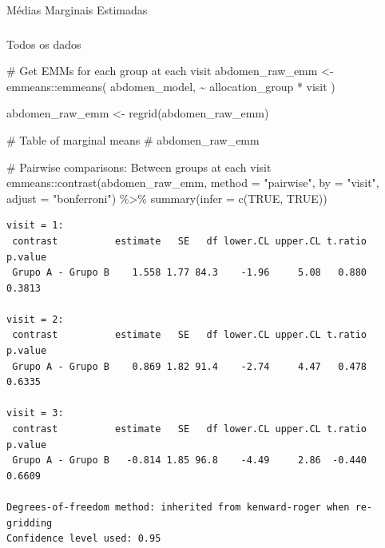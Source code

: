 \documentclass[
  12pt,
]{article}
\makeatletter
\let\oldparagraph\paragraph
\renewcommand{\paragraph}{
    \@ifstar
      \xxxParagraphStar
      \xxxParagraphNoStar
  }
\newcommand{\xxxParagraphStar}[1]{\oldparagraph*{#1}\mbox{}}
\newcommand{\xxxParagraphNoStar}[1]{\oldparagraph{#1}\mbox{}}
\let\oldsubparagraph\subparagraph
\renewcommand{\subparagraph}{
    \@ifstar
      \xxxSubParagraphStar
      \xxxSubParagraphNoStar
  }
\newcommand{\xxxSubParagraphStar}[1]{\oldsubparagraph*{#1}\mbox{}}
\newcommand{\xxxSubParagraphNoStar}[1]{\oldsubparagraph{#1}\mbox{}}
\newenvironment{Shaded}{\begin{snugshade}}{\end{snugshade}}
\newcommand{\AttributeTok}[1]{\textcolor[rgb]{0.40,0.45,0.13}{#1}}
\newcommand{\CommentTok}[1]{\textcolor[rgb]{0.37,0.37,0.37}{#1}}
\newcommand{\ConstantTok}[1]{\textcolor[rgb]{0.56,0.35,0.01}{#1}}
\newcommand{\FunctionTok}[1]{\textcolor[rgb]{0.28,0.35,0.67}{#1}}
\newcommand{\NormalTok}[1]{\textcolor[rgb]{0.00,0.23,0.31}{#1}}
\newcommand{\OtherTok}[1]{\textcolor[rgb]{0.00,0.23,0.31}{#1}}
\newcommand{\SpecialCharTok}[1]{\textcolor[rgb]{0.37,0.37,0.37}{#1}}
\newcommand{\StringTok}[1]{\textcolor[rgb]{0.13,0.47,0.30}{#1}}
\makeatother
\begin{document}
\paragraph{Médias Marginais
Estimadas}\label{muxe9dias-marginais-estimadas-13}

\subparagraph{Todos os dados}\label{todos-os-dados-13}

\begin{Shaded}
\begin{Highlighting}[]
\CommentTok{\# Get EMMs for each group at each visit}
\NormalTok{abdomen\_raw\_emm }\OtherTok{\textless{}{-}}\NormalTok{ emmeans}\SpecialCharTok{::}\FunctionTok{emmeans}\NormalTok{(}
\NormalTok{    abdomen\_model, }
    \SpecialCharTok{\textasciitilde{}}\NormalTok{ allocation\_group }\SpecialCharTok{*}\NormalTok{ visit}
\NormalTok{)}

\NormalTok{abdomen\_raw\_emm }\OtherTok{\textless{}{-}} \FunctionTok{regrid}\NormalTok{(abdomen\_raw\_emm)}

\CommentTok{\# Table of marginal means}
\CommentTok{\# abdomen\_raw\_emm}

\CommentTok{\# Pairwise comparisons: Between groups at each visit}
\NormalTok{emmeans}\SpecialCharTok{::}\FunctionTok{contrast}\NormalTok{(abdomen\_raw\_emm,}
\AttributeTok{method =} \StringTok{"pairwise"}\NormalTok{, }\AttributeTok{by =} \StringTok{"visit"}\NormalTok{,}
\AttributeTok{adjust =} \StringTok{"bonferroni"}\NormalTok{) }\SpecialCharTok{\%\textgreater{}\%} \FunctionTok{summary}\NormalTok{(}\AttributeTok{infer =} \FunctionTok{c}\NormalTok{(}\ConstantTok{TRUE}\NormalTok{, }\ConstantTok{TRUE}\NormalTok{))}
\end{Highlighting}
\end{Shaded}

\begin{verbatim}
visit = 1:
 contrast          estimate   SE   df lower.CL upper.CL t.ratio p.value
 Grupo A - Grupo B    1.558 1.77 84.3    -1.96     5.08   0.880  0.3813

visit = 2:
 contrast          estimate   SE   df lower.CL upper.CL t.ratio p.value
 Grupo A - Grupo B    0.869 1.82 91.4    -2.74     4.47   0.478  0.6335

visit = 3:
 contrast          estimate   SE   df lower.CL upper.CL t.ratio p.value
 Grupo A - Grupo B   -0.814 1.85 96.8    -4.49     2.86  -0.440  0.6609

Degrees-of-freedom method: inherited from kenward-roger when re-gridding 
Confidence level used: 0.95 
\end{verbatim}
\end{document}
